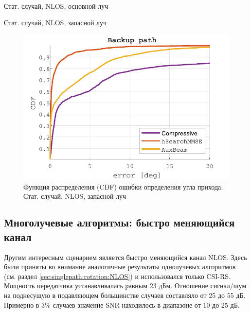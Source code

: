 \begin{table}[H]
  \begin{center}
    \caption{Стат. случай, NLOS, основной луч}
    \label{tab:multipath:static:NLOS:1}
  \end{center}
\end{table}

\begin{table}[H]
  \begin{center}
    \caption{Стат. случай, NLOS, запасной луч}
    \label{tab:multipath:static:NLOS:2}
  \end{center}
\end{table}
\begin{figure}[H]
  \centering
  \includegraphics{results/rus/multipath-static-NLOS-2}
  \caption{Функция распределения (CDF) ошибки определения угла прихода. Стат. случай, NLOS, запасной луч}
  \label{fig:multipath:static:NLOS:2}
\end{figure}

\subsection{Многолучевые алгоритмы: быстро меняющийся канал}
Другим интересным сценарием является быстро меняющийся канал NLOS. Здесь были
приняты во внимание аналогичные результаты однолучевых алгоритмов (см. раздел
\ref{sec:singlepath:rotation:NLOS}) и использовался только CSI-RS.  Мощность
передатчика устанавливалась равным 23 дБм.  Отношение сигнал/шум на поднесущую в
подавляющем большинстве случаев составляло от 25 до 55 дБ.  Примерно в 3\%
случаев значение SNR находилось в диапазоне от 10 до 25 дБ.

